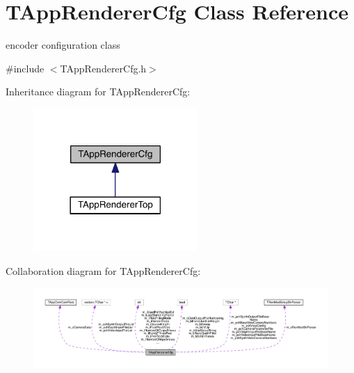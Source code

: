\hypertarget{class_t_app_renderer_cfg}{}\section{T\+App\+Renderer\+Cfg Class Reference}
\label{class_t_app_renderer_cfg}


encoder configuration class  




{\ttfamily \#include $<$T\+App\+Renderer\+Cfg.\+h$>$}



Inheritance diagram for T\+App\+Renderer\+Cfg\+:
\nopagebreak
\begin{figure}[H]
\begin{center}
\leavevmode
\includegraphics[width=177pt]{d9/d61/class_t_app_renderer_cfg__inherit__graph}
\end{center}
\end{figure}


Collaboration diagram for T\+App\+Renderer\+Cfg\+:
\nopagebreak
\begin{figure}[H]
\begin{center}
\leavevmode
\includegraphics[width=350pt]{d5/dfb/class_t_app_renderer_cfg__coll__graph}
\end{center}
\end{figure}
